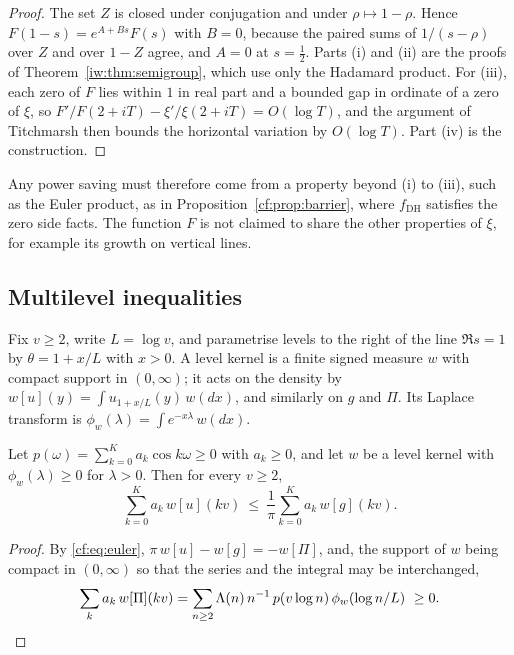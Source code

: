 \begin{proof}
The set $Z$ is closed under conjugation and under $\rho\mapsto1-\rho$. Hence $F(1-s)=e^{A+Bs}F(s)$ with $B=0$, because the paired sums of $1/(s-\rho)$ over $Z$ and over $1-Z$ agree, and $A=0$ at $s=\frac12$. Parts (i) and (ii) are the proofs of Theorem~\ref{iw:thm:semigroup}, which use only the Hadamard product. For (iii), each zero of $F$ lies within $1$ in real part and a bounded gap in ordinate of a zero of $\xi$, so $F'/F(2+iT)-\xi'/\xi(2+iT)=O(\log T)$, and the argument of Titchmarsh \cite[Chapter IX]{Titchmarsh} then bounds the horizontal variation by $O(\log T)$. Part (iv) is the construction.
\end{proof}

Any power saving must therefore come from a property beyond (i) to (iii), such as the Euler product, as in Proposition~\ref{cf:prop:barrier}, where $f_{\mathrm{DH}}$ satisfies the zero side facts. The function $F$ is not claimed to share the other properties of $\xi$, for example its growth on vertical lines.

\subsection{Multilevel inequalities}

Fix $v\ge2$, write $L=\log v$, and parametrise levels to the right of the line $\Re s=1$ by $\theta=1+x/L$ with $x>0$. A level kernel is a finite signed measure $w$ with compact support in $(0,\infty)$; it acts on the density by $w[u](y)=\int u_{1+x/L}(y)\,w(dx)$, and similarly on $g$ and $\Pi$. Its Laplace transform is $\phi_w(\lambda)=\int e^{-x\lambda}\,w(dx)$.

\begin{theorem}\label{cf:thm:multilevel}
Let $p(\omega)=\sum_{k=0}^Ka_k\cos k\omega\ge0$ with $a_k\ge0$, and let $w$ be a level kernel with $\phi_w(\lambda)\ge0$ for $\lambda>0$. Then for every $v\ge2$,
\[
\sum_{k=0}^Ka_k\,w[u](kv)\ \le\ \frac1\pi\sum_{k=0}^Ka_k\,w[g](kv).
\]
\end{theorem}

\begin{proof}
By \eqref{cf:eq:euler}, $\pi\,w[u]-w[g]=-w[\Pi]$, and, the support of $w$ being compact in $(0,\infty)$ so that the series and the integral may be interchanged,
\[
\sum_ka_k\,w[\Pi](kv)=\sum_{n\ge2}\Lambda(n)\,n^{-1}\,p(v\log n)\,\phi_w(\log n/L)\ \ge0 .\qedhere
\]
\end{proof}

